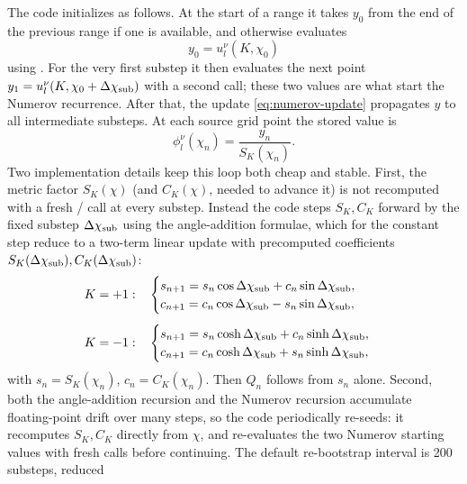 \documentclass[11pt,a4paper]{article}
\newcommand{\code}[1]{\texttt{\detokenize{#1}}}
\newcommand{\SK}{S_K}
\newcommand{\CK}{C_K}
\begin{document}
The code initializes as follows.  At the start of a range it takes \(y_0\) from the end of the previous range if one is available, and otherwise evaluates
\begin{equation}
  y_0=u_l^\nu(K,\chi_0)
\end{equation}
using \code{u_olver}.  For the very first substep it then evaluates the next point \(y_1=u_l^\nu(K,\chi_0+\Delta\chi_{\rm sub})\) with a second \code{u_olver} call; these two values are what start the Numerov recurrence.  After that, the update \eqref{eq:numerov-update} propagates \(y\) to all intermediate substeps.  At each source grid point the stored value is
\begin{equation}
  \phi_l^\nu(\chi_n)=\frac{y_n}{\SK(\chi_n)}.
\end{equation}
Two implementation details keep this loop both cheap and stable.  First, the
metric factor \(\SK(\chi)\) (and \(\CK(\chi)\), needed to advance it) is not
recomputed with a fresh \code{sin}/\code{sinh} call at every substep.  Instead
the code steps \(\SK,\CK\) forward by the fixed substep \(\Delta\chi_{\rm sub}\)
using the angle-addition formulae, which for the constant step reduce to a
two-term linear update with precomputed coefficients
\(\SK(\Delta\chi_{\rm sub}),\CK(\Delta\chi_{\rm sub})\):
\begin{equation}
  \begin{aligned}
  K=+1:&\quad
  \begin{cases}
    s_{n+1}=s_n\cos\Delta\chi_{\rm sub}+c_n\sin\Delta\chi_{\rm sub},\\
    c_{n+1}=c_n\cos\Delta\chi_{\rm sub}-s_n\sin\Delta\chi_{\rm sub},
  \end{cases}\\[1ex]
  K=-1:&\quad
  \begin{cases}
    s_{n+1}=s_n\cosh\Delta\chi_{\rm sub}+c_n\sinh\Delta\chi_{\rm sub},\\
    c_{n+1}=c_n\cosh\Delta\chi_{\rm sub}+s_n\sinh\Delta\chi_{\rm sub},
  \end{cases}
  \end{aligned}
\end{equation}
with \(s_n=\SK(\chi_n)\), \(c_n=\CK(\chi_n)\).  Then \(Q_n\) follows from
\(s_n\) alone.  Second, both the angle-addition recursion and the Numerov
recursion accumulate floating-point drift over many steps, so the code
periodically re-seeds: it recomputes \(\SK,\CK\) directly from \(\chi\), and
re-evaluates the two Numerov starting values with fresh \code{u_olver} calls
before continuing.  The default re-bootstrap interval is 200 substeps, reduced
\end{document}
